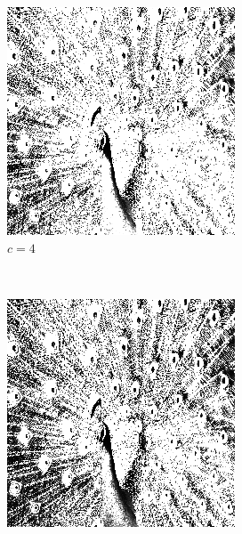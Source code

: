 \documentclass{article}
\begin{document}
\begin{enumerate}[label=(\alph*)]
\begin{figure}[!htb]
        \begin{subfigure}[b]{0.3\textwidth}
            \includegraphics[width=\textwidth]{img/ILT4.png}
            \caption{$c = 4$}
        \end{subfigure}
        ~
        \begin{subfigure}[b]{0.3\textwidth}
            \includegraphics[width=\textwidth]{img/ILT5.png}

\end{subfigure}
\end{figure}
\end{enumerate}
\end{document}
